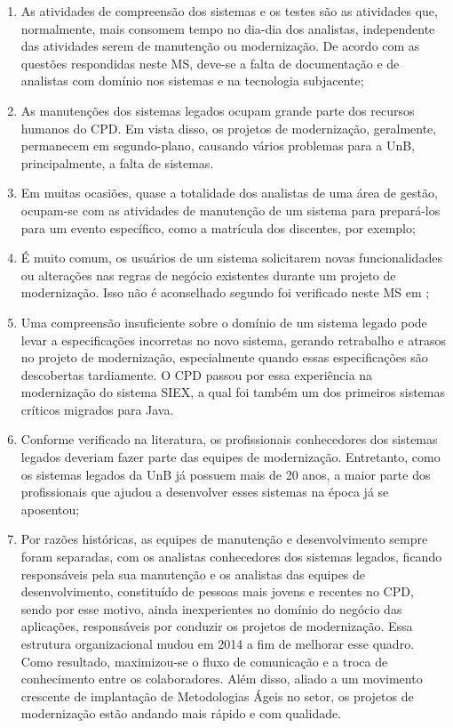 \begin{enumerate}

\item
As atividades de compreensão dos sistemas e os testes são as atividades que, normalmente, mais consomem tempo no dia-dia dos analistas, independente das atividades serem de manutenção ou modernização. De acordo com as questões respondidas neste MS, deve-se a falta de documentação e de analistas com domínio nos sistemas e na tecnologia subjacente;

\item
As manutenções dos sistemas legados ocupam grande parte dos recursos humanos do CPD. Em vista disso, os projetos de modernização, geralmente, permanecem em segundo-plano, causando vários problemas para a UnB, principalmente, a falta de sistemas.

\item
Em muitas ocasiões, quase a totalidade dos analistas de uma área de gestão, ocupam-se com as atividades de manutenção de um sistema para prepará-los para um evento específico, como a matrícula dos discentes, por exemplo;

\item
É muito comum, os usuários de um sistema solicitarem novas funcionalidades ou alterações nas regras de negócio existentes durante um projeto de modernização. Isso não é aconselhado segundo foi verificado neste \acrshort{MS} em \cite{Seacord:2003};

\item
Uma compreensão insuficiente sobre o domínio de um sistema legado pode levar a especificações incorretas no novo sistema, gerando retrabalho e atrasos no projeto de modernização, especialmente quando essas especificações são descobertas tardiamente. O \acrshort{CPD} passou por essa experiência na modernização do sistema SIEX, a qual foi também um dos primeiros sistemas críticos migrados para Java.

\item
Conforme verificado na literatura, os profissionais conhecedores dos sistemas legados deveriam fazer parte das equipes de modernização. Entretanto, como os sistemas legados da \acrshort{UnB} já possuem mais de 20 anos, a maior parte dos profissionais que ajudou a desenvolver esses sistemas na época já se aposentou;

\item
Por razões históricas, as equipes de manutenção e desenvolvimento sempre foram separadas, com os analistas conhecedores dos sistemas legados, ficando responsáveis pela sua manutenção e os analistas das equipes de desenvolvimento, constituído de pessoas mais jovens e recentes no CPD, sendo por esse motivo, ainda inexperientes no domínio do negócio das aplicações, responsáveis por  conduzir os projetos de modernização. Essa estrutura organizacional mudou em 2014 a fim de melhorar esse quadro. Como resultado, maximizou-se o fluxo de comunicação e a troca de conhecimento entre os colaboradores. Além disso, aliado a um movimento crescente de implantação de Metodologias Ágeis no setor, os projetos de modernização estão andando mais rápido e com qualidade.


\end{enumerate}
